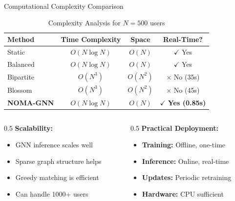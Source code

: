 \documentclass[aspectratio=169]{beamer}
\begin{document}
\begin{frame}{Computational Complexity Comparison}
    \begin{table}
        \centering
        \begin{tabular}{lccc}
            \toprule
            \textbf{Method} & \textbf{Time Complexity} & \textbf{Space} & \textbf{Real-Time?} \\
            \midrule
            Static & $O(N \log N)$ & $O(N)$ & $\checkmark$ Yes \\
            Balanced & $O(N \log N)$ & $O(N)$ & $\checkmark$ Yes \\
            Bipartite & $O(N^3)$ & $O(N^2)$ & $\times$ No (35s) \\
            Blossom & $O(N^3)$ & $O(N^2)$ & $\times$ No (45s) \\
            \midrule
            \rowcolor{lightgreen}
            \textbf{NOMA-GNN} & $O(N \log N)$ & $O(N)$ & $\checkmark$ \textbf{Yes (0.85s)} \\
            \bottomrule
        \end{tabular}
        \caption{Complexity Analysis for $N=500$ users}
    \end{table}
    
    \vspace{0.3cm}
    
    \begin{columns}
        \begin{column}{0.5\textwidth}
            \textbf{Scalability:}
            \begin{itemize}
                \item GNN inference scales well
                \item Sparse graph structure helps
                \item Greedy matching is efficient
                \item Can handle 1000+ users
            \end{itemize}
        \end{column}
        \begin{column}{0.5\textwidth}
            \textbf{Practical Deployment:}
            \begin{itemize}
                \item \textbf{Training:} Offline, one-time
                \item \textbf{Inference:} Online, real-time
                \item \textbf{Updates:} Periodic retraining
                \item \textbf{Hardware:} CPU sufficient
            \end{itemize}
        \end{column}
    \end{columns}
\end{frame}
\end{document}
